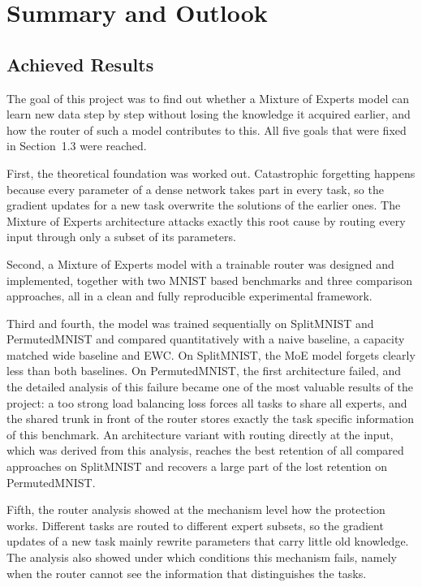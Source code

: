 \chapter{Summary and Outlook}
\label{chap:summary}

\section{Achieved Results}
\label{sec:achieved}

The goal of this project was to find out whether a Mixture of Experts model
can learn new data step by step without losing the knowledge it acquired
earlier, and how the router of such a model contributes to this. All five
goals that were fixed in Section~1.3 were reached.

First, the theoretical foundation was worked out. Catastrophic forgetting
happens because every parameter of a dense network takes part in every
task, so the gradient updates for a new task overwrite the solutions of the
earlier ones. The Mixture of Experts architecture attacks exactly this root
cause by routing every input through only a subset of its parameters.

Second, a Mixture of Experts model with a trainable router was designed and
implemented, together with two MNIST based benchmarks and three comparison
approaches, all in a clean and fully reproducible experimental framework.

Third and fourth, the model was trained sequentially on SplitMNIST and
PermutedMNIST and compared quantitatively with a naive baseline, a capacity
matched wide baseline and EWC. On SplitMNIST, the MoE model forgets clearly
less than both baselines. On PermutedMNIST, the first architecture failed,
and the detailed analysis of this failure became one of the most valuable
results of the project: a too strong load balancing loss forces all tasks
to share all experts, and the shared trunk in front of the router stores
exactly the task specific information of this benchmark. An architecture
variant with routing directly at the input, which was derived from this
analysis, reaches the best retention of all compared approaches on
SplitMNIST and recovers a large part of the lost retention on
PermutedMNIST.

Fifth, the router analysis showed at the mechanism level how the protection
works. Different tasks are routed to different expert subsets, so the
gradient updates of a new task mainly rewrite parameters that carry little
old knowledge. The analysis also showed under which conditions this
mechanism fails, namely when the router cannot see the information that
distinguishes the tasks.


